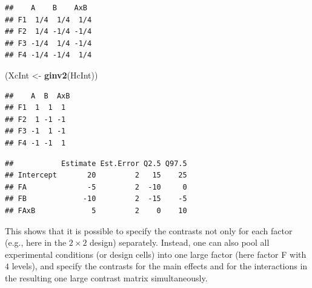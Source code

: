 \documentclass[12pt,]{krantz}
\newenvironment{Shaded}{\begin{snugshade}}{\end{snugshade}}
\newcommand{\KeywordTok}[1]{\textcolor[rgb]{0.13,0.29,0.53}{\textbf{#1}}}
\newcommand{\DataTypeTok}[1]{\textcolor[rgb]{0.13,0.29,0.53}{#1}}
\newcommand{\DecValTok}[1]{\textcolor[rgb]{0.00,0.00,0.81}{#1}}
\newcommand{\StringTok}[1]{\textcolor[rgb]{0.31,0.60,0.02}{#1}}
\newcommand{\OperatorTok}[1]{\textcolor[rgb]{0.81,0.36,0.00}{\textbf{#1}}}
\newcommand{\NormalTok}[1]{#1}
\theoremstyle{definition}
\theoremstyle{definition}
\theoremstyle{definition}
\theoremstyle{remark}
\begin{document}
\begin{verbatim}
##    A    B    AxB 
## F1  1/4  1/4  1/4
## F2  1/4 -1/4 -1/4
## F3 -1/4  1/4 -1/4
## F4 -1/4 -1/4  1/4
\end{verbatim}

\begin{Shaded}
\begin{Highlighting}[]
\NormalTok{(XcInt <-}\StringTok{ }\KeywordTok{ginv2}\NormalTok{(HcInt))}
\end{Highlighting}
\end{Shaded}

\begin{verbatim}
##    A  B  AxB
## F1  1  1  1 
## F2  1 -1 -1 
## F3 -1  1 -1 
## F4 -1 -1  1
\end{verbatim}

\begin{Shaded}
\end{Shaded}

\begin{verbatim}
##           Estimate Est.Error Q2.5 Q97.5
## Intercept       20         2   15    25
## FA              -5         2  -10     0
## FB             -10         2  -15    -5
## FAxB             5         2    0    10
\end{verbatim}

This shows that it is possible to specify the contrasts not only for
each factor (e.g., here in the \(2 \times 2\) design) separately.
Instead, one can also pool all experimental conditions (or design cells)
into one large factor (here factor F with \(4\) levels), and specify the
contrasts for the main effects and for the interactions in the resulting
one large contrast matrix simultaneously.
\end{document}
